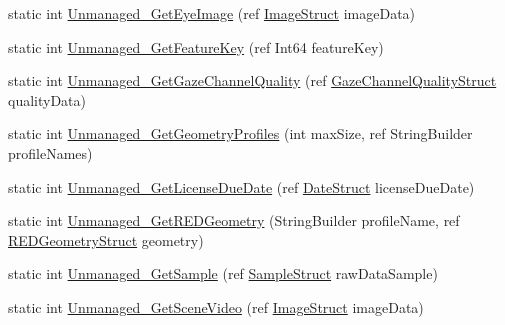 \begin{DoxyCompactItemize}
\item 
static int \hyperlink{class_web_analyzer_1_1_eye_tracking_1_1_eye_tracking_controller_a749de65be84cdadd3f8b09a6f38c7932}{Unmanaged\+\_\+\+Get\+Eye\+Image} (ref \hyperlink{struct_web_analyzer_1_1_eye_tracking_1_1_eye_tracking_controller_1_1_image_struct}{Image\+Struct} image\+Data)
\item 
static int \hyperlink{class_web_analyzer_1_1_eye_tracking_1_1_eye_tracking_controller_a79cc757c5123ff7f393ed884933e5769}{Unmanaged\+\_\+\+Get\+Feature\+Key} (ref Int64 feature\+Key)
\item 
static int \hyperlink{class_web_analyzer_1_1_eye_tracking_1_1_eye_tracking_controller_a587787190d34cb5cefbc7b88a3d5cd59}{Unmanaged\+\_\+\+Get\+Gaze\+Channel\+Quality} (ref \hyperlink{struct_web_analyzer_1_1_eye_tracking_1_1_eye_tracking_controller_1_1_gaze_channel_quality_struct}{Gaze\+Channel\+Quality\+Struct} quality\+Data)
\item 
static int \hyperlink{class_web_analyzer_1_1_eye_tracking_1_1_eye_tracking_controller_acf40ec722b4022505a84fb149c7aed2a}{Unmanaged\+\_\+\+Get\+Geometry\+Profiles} (int max\+Size, ref String\+Builder profile\+Names)
\item 
static int \hyperlink{class_web_analyzer_1_1_eye_tracking_1_1_eye_tracking_controller_afcde4d0940201901a8415aa350837893}{Unmanaged\+\_\+\+Get\+License\+Due\+Date} (ref \hyperlink{struct_web_analyzer_1_1_eye_tracking_1_1_eye_tracking_controller_1_1_date_struct}{Date\+Struct} license\+Due\+Date)
\item 
static int \hyperlink{class_web_analyzer_1_1_eye_tracking_1_1_eye_tracking_controller_abd268336bb9f6ac82b4f0cf8126986a0}{Unmanaged\+\_\+\+Get\+R\+E\+D\+Geometry} (String\+Builder profile\+Name, ref \hyperlink{struct_web_analyzer_1_1_eye_tracking_1_1_eye_tracking_controller_1_1_r_e_d_geometry_struct}{R\+E\+D\+Geometry\+Struct} geometry)
\item 
static int \hyperlink{class_web_analyzer_1_1_eye_tracking_1_1_eye_tracking_controller_a556a0d344834d72558f0e89040cd55f1}{Unmanaged\+\_\+\+Get\+Sample} (ref \hyperlink{struct_web_analyzer_1_1_eye_tracking_1_1_eye_tracking_controller_1_1_sample_struct}{Sample\+Struct} raw\+Data\+Sample)
\item 
static int \hyperlink{class_web_analyzer_1_1_eye_tracking_1_1_eye_tracking_controller_a08b33cde9b7b73a123f644cd6b593886}{Unmanaged\+\_\+\+Get\+Scene\+Video} (ref \hyperlink{struct_web_analyzer_1_1_eye_tracking_1_1_eye_tracking_controller_1_1_image_struct}{Image\+Struct} image\+Data)
\item 

\end{DoxyCompactItemize}
